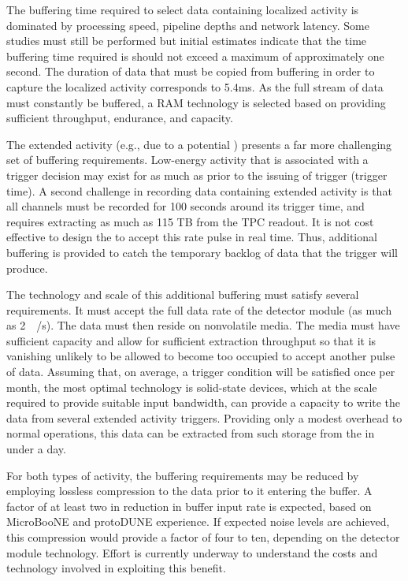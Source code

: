 The buffering time required to select data containing localized activity is dominated by processing speed, pipeline depths and network latency. 
Some studies must still be performed but initial estimates indicate that the time buffering time required is should not exceed a maximum of approximately one second. 
The duration of data that must be copied from buffering in order to
capture the localized activity corresponds to 5.4\si{\milli\second}.
As the full stream of data must constantly be buffered, a RAM
technology is selected based on providing sufficient throughput,
endurance, and capacity. 

The extended activity (e.g., due to a potential ) presents a far more challenging set of buffering requirements.  
Low-energy activity that is associated with a  trigger
decision may exist for as much as \snbpretime prior to the issuing of 
trigger (trigger time).
A second challenge in recording data containing extended activity is
that all channels must be recorded for 100 seconds around its trigger
time, and requires extracting as much as 115 TB from the TPC readout.
It is not cost effective to design the  to accept this rate
pulse in real time. Thus, additional buffering is provided to catch
the temporary backlog of data that the  trigger will produce.

The technology and scale of this additional buffering must satisfy several requirements. 
It must accept the full data rate of the detector module (as much as \SI{2}{\tera\byte/\second}). 
The data must then reside on nonvolatile media. 
The media must have sufficient capacity and allow for sufficient extraction throughput so that it is vanishing unlikely to be allowed to become too occupied to accept another pulse of data. 
Assuming that, on average, a  trigger condition will be
satisfied once per month, the most optimal technology is %
solid-state devices, which at the scale required to provide suitable input bandwidth, can provide a capacity to write the data from several extended activity triggers.
Providing only a modest overhead to normal operations, this data can be extracted from such storage from the  in under a day.

For both types of activity, the buffering requirements may be reduced by employing lossless compression to the data prior to it entering the buffer.
A factor of at least two in reduction in buffer input rate is
expected, based on MicroBooNE and protoDUNE experience. 
If expected noise levels are achieved, this compression would provide a factor of four to ten, depending on the detector module technology.
Effort is currently underway to understand the costs and technology involved in exploiting this benefit.

